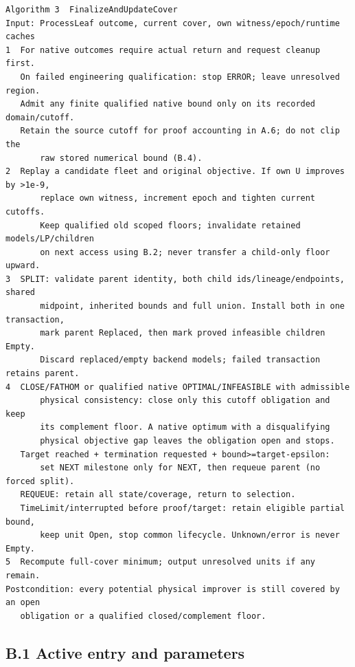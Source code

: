 \documentclass[
  american,
  11pt,
]{article}
\begin{document}
\par\medskip\noindent\begin{minipage}{\linewidth}

\begin{lstlisting}
Algorithm 3  FinalizeAndUpdateCover
Input: ProcessLeaf outcome, current cover, own witness/epoch/runtime caches
1  For native outcomes require actual return and request cleanup first.
   On failed engineering qualification: stop ERROR; leave unresolved region.
   Admit any finite qualified native bound only on its recorded domain/cutoff.
   Retain the source cutoff for proof accounting in A.6; do not clip the
       raw stored numerical bound (B.4).
2  Replay a candidate fleet and original objective. If own U improves by >1e-9,
       replace own witness, increment epoch and tighten current cutoffs.
       Keep qualified old scoped floors; invalidate retained models/LP/children
       on next access using B.2; never transfer a child-only floor upward.
3  SPLIT: validate parent identity, both child ids/lineage/endpoints, shared
       midpoint, inherited bounds and full union. Install both in one transaction,
       mark parent Replaced, then mark proved infeasible children Empty.
       Discard replaced/empty backend models; failed transaction retains parent.
4  CLOSE/FATHOM or qualified native OPTIMAL/INFEASIBLE with admissible
       physical consistency: close only this cutoff obligation and keep
       its complement floor. A native optimum with a disqualifying
       physical objective gap leaves the obligation open and stops.
   Target reached + termination requested + bound>=target-epsilon:
       set NEXT milestone only for NEXT, then requeue parent (no forced split).
   REQUEUE: retain all state/coverage, return to selection.
   TimeLimit/interrupted before proof/target: retain eligible partial bound,
       keep unit Open, stop common lifecycle. Unknown/error is never Empty.
5  Recompute full-cover minimum; output unresolved units if any remain.
Postcondition: every potential physical improver is still covered by an open
   obligation or a qualified closed/complement floor.
\end{lstlisting}

\end{minipage}\par\medskip

\subsection{B.1 Active entry and
parameters}\label{b.1-active-entry-and-parameters}
\end{document}
